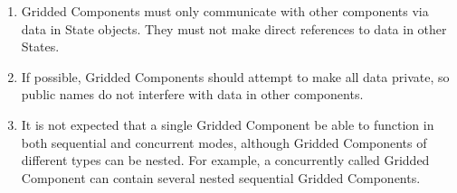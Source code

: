 %


\begin{enumerate}

\item Gridded Components must only communicate with other
components via data in State objects.  They must 
not make direct references to data in other States.

\item If possible, Gridded Components should attempt to make 
all data private, so public names do not interfere with data 
in other components.

\item It is not expected that a single Gridded Component be able 
to function in both sequential and concurrent modes, although 
Gridded Components of different types can be nested. For example,
a concurrently called Gridded Component can contain several nested 
sequential Gridded Components.  

\end{enumerate}
